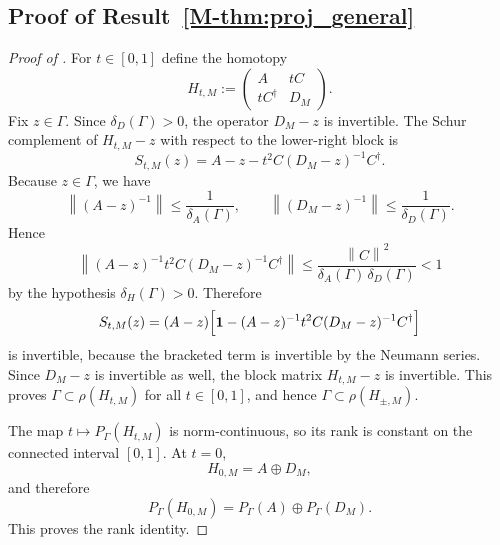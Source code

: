 \documentclass[11pt]{article}
\numberwithin{equation}{section}
\theoremstyle{definition}
\theoremstyle{remark}
\newcommand{\Id}{\mathbf{1}}
\newcommand{\opnorm}[1]{\left\lVert#1\right\rVert}
\begin{document}
\subsection{Proof of Result~\ref{M-thm:proj_general}}\label{app:proof:thm:proj_general}
\begin{proof}[Proof of ]
For $t\in[0,1]$ define the homotopy
\[
H_{t,M}:=
\begin{pmatrix}
A&tC\\
tC^\dagger&D_M
\end{pmatrix}.
\]
Fix $z\in\Gamma$. Since $\delta_D(\Gamma)>0$, the operator $D_M-z$ is invertible. The Schur complement of $H_{t,M}-z$ with respect to the lower-right block is
\[
S_{t,M}(z)=A-z-t^2C(D_M-z)^{-1}C^\dagger.
\]
Because $z\in\Gamma$, we have
\[
\opnorm{(A-z)^{-1}}\le \frac{1}{\delta_A(\Gamma)},
\qquad
\opnorm{(D_M-z)^{-1}}\le \frac{1}{\delta_D(\Gamma)}.
\]
Hence
\[
\opnorm{(A-z)^{-1}t^2C(D_M-z)^{-1}C^\dagger}
\le
\frac{\opnorm{C}^2}{\delta_A(\Gamma)\,\delta_D(\Gamma)}
<1
\]
by the hypothesis $\delta_H(\Gamma)>0$. Therefore
\[
S_{t,M}(z)
=
(A-z)\Bigl[\Id-(A-z)^{-1}t^2C(D_M-z)^{-1}C^\dagger\Bigr]
\]
is invertible, because the bracketed term is invertible by the Neumann series. Since $D_M-z$ is invertible as well, the block matrix $H_{t,M}-z$ is invertible. This proves $\Gamma\subset\rho(H_{t,M})$ for all $t\in[0,1]$, and hence $\Gamma\subset\rho(H_{\pm,M})$.

The map $t\mapsto P_\Gamma(H_{t,M})$ is norm-continuous, so its rank is constant on the connected interval $[0,1]$. At $t=0$,
\[
H_{0,M}=A\oplus D_M,
\]
and therefore
\[
P_\Gamma(H_{0,M})=P_\Gamma(A)\oplus P_\Gamma(D_M).
\]
This proves the rank identity.


\end{proof}
\end{document}
